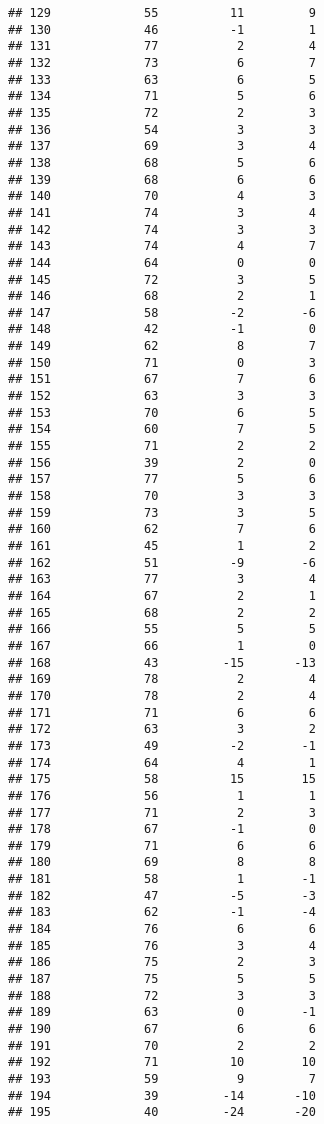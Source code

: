 \documentclass[]{article}
\begin{document}
\begin{verbatim}
## 129             55          11         9
## 130             46          -1         1
## 131             77           2         4
## 132             73           6         7
## 133             63           6         5
## 134             71           5         6
## 135             72           2         3
## 136             54           3         3
## 137             69           3         4
## 138             68           5         6
## 139             68           6         6
## 140             70           4         3
## 141             74           3         4
## 142             74           3         3
## 143             74           4         7
## 144             64           0         0
## 145             72           3         5
## 146             68           2         1
## 147             58          -2        -6
## 148             42          -1         0
## 149             62           8         7
## 150             71           0         3
## 151             67           7         6
## 152             63           3         3
## 153             70           6         5
## 154             60           7         5
## 155             71           2         2
## 156             39           2         0
## 157             77           5         6
## 158             70           3         3
## 159             73           3         5
## 160             62           7         6
## 161             45           1         2
## 162             51          -9        -6
## 163             77           3         4
## 164             67           2         1
## 165             68           2         2
## 166             55           5         5
## 167             66           1         0
## 168             43         -15       -13
## 169             78           2         4
## 170             78           2         4
## 171             71           6         6
## 172             63           3         2
## 173             49          -2        -1
## 174             64           4         1
## 175             58          15        15
## 176             56           1         1
## 177             71           2         3
## 178             67          -1         0
## 179             71           6         6
## 180             69           8         8
## 181             58           1        -1
## 182             47          -5        -3
## 183             62          -1        -4
## 184             76           6         6
## 185             76           3         4
## 186             75           2         3
## 187             75           5         5
## 188             72           3         3
## 189             63           0        -1
## 190             67           6         6
## 191             70           2         2
## 192             71          10        10
## 193             59           9         7
## 194             39         -14       -10
## 195             40         -24       -20
\end{verbatim}
\end{document}
